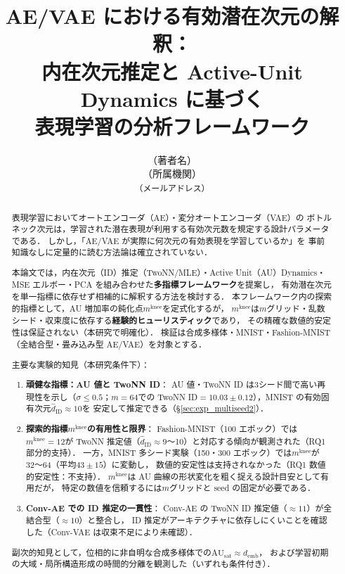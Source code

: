 \documentclass[11pt,a4paper]{jsarticle}
\title{AE/VAE における有効潜在次元の解釈：\\
       内在次元推定と Active-Unit Dynamics に基づく\\
       表現学習の分析フレームワーク}
\author{（著者名）\\
{\small （所属機関）}\\
{\small \texttt{（メールアドレス）}}}
\date{}
\newcommand{\mknee}{m^{\mathrm{knee}}}
\begin{document}
\maketitle

\begin{abstract}
表現学習においてオートエンコーダ（AE）・変分オートエンコーダ（VAE）の
ボトルネック次元は，学習された潜在表現が利用する有効次元数を規定する設計パラメータである．
しかし，「AE/VAE が実際に何次元の有効表現を学習しているか」を
事前知識なしに定量的に読む方法論は確立されていない．

本論文では，内在次元（ID）推定（TwoNN/MLE）・Active Unit（AU）Dynamics・
MSE エルボー・PCA を組み合わせた\textbf{多指標フレームワーク}を提案し，
有効潜在次元を単一指標に依存せず相補的に解釈する方法を検討する．
本フレームワーク内の探索的指標として，AU 増加率の鈍化点$m^{\mathrm{knee}}$を定式化するが，
$m^{\mathrm{knee}}$は$m$グリッド・乱数シード・収束度に依存する\textbf{経験的ヒューリスティック}であり，
その精確な数値的安定性は保証されない（本研究で明確化）．
検証は合成多様体・MNIST・Fashion-MNIST（全結合型・畳み込み型 AE/VAE）を対象とする．

主要な実験的知見（本研究条件下）：
\begin{enumerate}
  \item \textbf{頑健な指標：AU 値と TwoNN ID}：
        AU 値・TwoNN ID は3シード間で高い再現性を示し（$\sigma \leq 0.5$；$m=64$での
        TwoNN ID$= 10.03 \pm 0.12$），MNIST の有効固有次元$\hat{d}_\mathrm{ID} \approx 10$を
        安定して推定できる（§\ref{sec:exp_multiseed2}）．
  \item \textbf{探索的指標$m^{\mathrm{knee}}$の有用性と限界}：
        Fashion-MNIST（100 エポック）では$m^{\mathrm{knee}} = 12$が
        TwoNN 推定値（$\hat{d}_\mathrm{ID} \approx 9$〜10）と対応する傾向が観測された（RQ1 部分的支持）．
        一方，MNIST 多シード実験（150・300 エポック）では$\mknee$が 32〜64（平均$43 \pm 15$）に変動し，
        数値的安定性は支持されなかった（RQ1 数値的安定性：不支持）．
        $\mknee$は AU 曲線の形状変化を粗く捉える設計目安として有用だが，
        特定の数値を信頼するには$m$グリッドと seed の固定が必要である．
  \item \textbf{Conv-AE での ID 推定の一貫性}：
        Conv-AE の TwoNN ID 推定値（$\approx 11$）が全結合型（$\approx 10$）と整合し，
        ID 推定がアーキテクチャに依存しにくいことを確認した（Conv-VAE は収束不足により未確認）．
\end{enumerate}
副次的知見として，位相的に非自明な合成多様体での$\mathrm{AU}_{\mathrm{sat}} \approx d_{\mathrm{emb}}$，
および学習初期の大域・局所構造形成の時間的分離を観測した（いずれも条件付き）．
\end{abstract}
\end{document}
